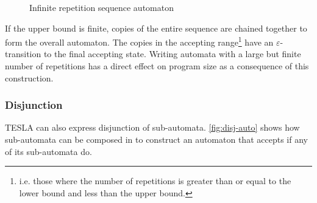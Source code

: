 \begin{figure}
  \centering
  \caption{Infinite repetition sequence automaton}
  \label{fig:seq-inf-auto}
\end{figure}

If the upper bound is finite, copies of the entire sequence are chained
together to form the overall automaton. The copies in the accepting
range\footnote{i.e. those where the number of repetitions is greater
than or equal to the lower bound and less than the upper bound.} have an
$\varepsilon$-transition to the final accepting state. Writing automata
with a large but finite number of repetitions has a direct effect on
program size as a consequence of this construction.

\subsubsection{Disjunction}

TESLA can also express disjunction of sub-automata.
\autoref{fig:disj-auto} shows how sub-automata can be composed in
 to construct an automaton that accepts if any of
its sub-automata do.

